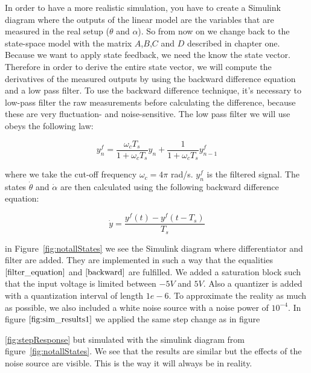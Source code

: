 \documentclass[ twoside,openright,titlepage,numbers=noenddot,headinclude,%
                footinclude=true,cleardoublepage=empty,abstractoff, %
                BCOR=5mm,paper=a4,fontsize=11pt,%
                ngerman,american,%
                ]{scrreprt}
\begin{document}
{In order to have a more realistic simulation, you have to create a Simulink diagram where the outputs of the linear model are the variables that are measured in the real setup ($\theta$ and $\alpha$). So from now on we change back to the state-space model with the matrix $A$,$B$,$C$ and $D$ described in chapter one. Because we want to apply state feedback, we need the know the state vector. Therefore in order to derive the entire state vector, we will compute the derivatives of the measured outputs by using the backward difference equation and a low pass filter. To use the backward difference technique, it's necessary to low-pass filter the raw measurements before calculating the difference, because these are very fluctuation- and noise-sensitive. The low pass filter we will use obeys the following law:

\begin{equation} \label{filter_equation}
y_n^f = \frac{\omega_c T_s}{1 + \omega_c T_s} y_n + \frac{1}{1 + \omega_c T_s} y_{n-1}^f
\end{equation}
 
where we take the cut-off frequency $\omega_c = 4 \pi$ rad/s. $y_n^f$ is the filtered signal. The states $\dot{\theta}$ and $\dot{\alpha}$ are then calculated using the following backward difference equation:

\begin{equation} \label{backward}
\dot{y} = \frac{y^f(t) - y^f(t - T_s)}{T_s}
\end{equation}

in Figure~\ref{fig:notallStates} we see the Simulink diagram where differentiator and filter are added. They are implemented in such a way that the equalities $\eqref{filter_equation}$ and $\eqref{backward}$ are fulfilled. We added a saturation block such that the input voltage is limited between $-5V$ and $5V$. Also a quantizer is added with a quantization interval of length $1e-6$. To approximate the reality as much as possible, we also included a white noise source with a noise power of $10^{-4}$. In figure $\eqref{fig:sim_results1}$ we applied the same step change as in figure~{\ref{fig:stepResponse} but simulated with the simulink diagram from figure~\ref{fig:notallStates}. We see that the results are similar but the effects of the noise source are visible. This is the way it will always be in reality.

}}
\end{document}
